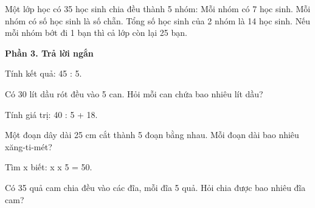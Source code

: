 \begin{ex} %
Một lớp học có 35 học sinh chia đều thành 5 nhóm:
\choiceTF
{\True Mỗi nhóm có 7 học sinh.}
{Mỗi nhóm có số học sinh là số chẵn.}
{\True Tổng số học sinh của 2 nhóm là 14 học sinh.}
{Nếu mỗi nhóm bớt đi 1 bạn thì cả lớp còn lại 25 bạn.}
\end{ex}

\textbf{Phần 3. Trả lời ngắn}

\begin{ex} %
Tính kết quả: 45 : 5.
\end{ex}

\begin{ex} %
Có 30 lít dầu rót đều vào 5 can. Hỏi mỗi can chứa bao nhiêu lít dầu?
\end{ex}

\begin{ex} %
Tính giá trị: 40 : 5 + 18.
\end{ex}

\begin{ex} %
Một đoạn dây dài 25 cm cắt thành 5 đoạn bằng nhau. Mỗi đoạn dài bao nhiêu xăng-ti-mét?
\end{ex}

\begin{ex} %
Tìm x biết: x x 5 = 50.
\end{ex}

\begin{ex} %
Có 35 quả cam chia đều vào các đĩa, mỗi đĩa 5 quả. Hỏi chia được bao nhiêu đĩa cam?
\end{ex}
